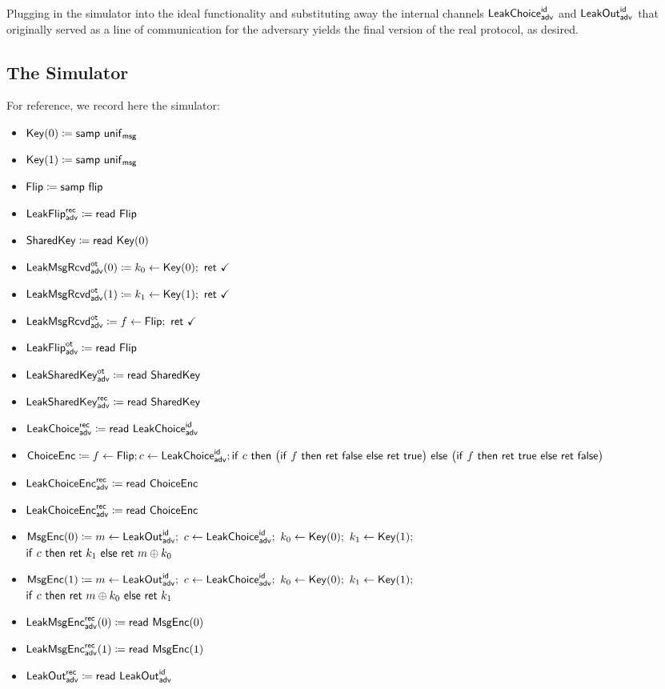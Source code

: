 Plugging in the simulator into the ideal functionality and substituting away the internal channels $\LeakChoice^\id_\adv$ and $\LeakOut^\id_\adv$ that originally served as a line of communication for the adversary yields the final version of the real protocol, as desired.

\subsection{The Simulator}
For reference, we record here the simulator:
\begin{itemize}
\item $\Key(0) \coloneqq \samp{\unif_\msg}$
\item $\Key(1) \coloneqq \samp{\unif_\msg}$
\item $\Flip \coloneqq \samp{\flip}$
\item {\color{blue} $\LeakFlip^\rec_\adv \coloneqq \read{\Flip}$}
\item $\SharedKey \coloneqq \read{\Key(0)}$
\item {\color{blue} $\LeakKeyRcvd^\ot_\adv(0) \coloneqq k_0 \leftarrow \Key(0); \ \ret{\checkmark}$}
\item {\color{blue} $\LeakKeyRcvd^\ot_\adv(1) \coloneqq k_1 \leftarrow \Key(1); \ \ret{\checkmark}$}
\item {\color{blue} $\LeakFlipRcvd^\ot_\adv \coloneqq f \leftarrow \Flip; \ \ret{\checkmark}$}
\item {\color{blue} $\LeakFlip^\ot_\adv \coloneqq \read{\Flip}$}
\item {\color{blue} $\LeakSharedKey^\ot_\adv \coloneqq \read{\SharedKey}$}
\item {\color{blue} $\LeakSharedKey^\rec_\adv \coloneqq \read{\SharedKey}$}
\item {\color{blue} $\LeakChoice^\rec_\adv \coloneqq \read{\LeakChoice^\id_\adv}$}
\item $\ChoiceEnc \coloneqq f \leftarrow \Flip; c \leftarrow \LeakChoice^\id_\adv; \\ \ifte{c}{\big(\ifte{f}{\ret{\false}}{\ret{\true}}\big)}{\big(\ifte{f}{\ret{\true}}{\ret{\false}}\big)}$
\item {\color{blue} $\LeakChoiceEnc^\rec_\adv \coloneqq \read{\ChoiceEnc}$}
\item {\color{blue} $\LeakChoiceEnc^\rec_\adv \coloneqq \read{\ChoiceEnc}$}
\item $\MsgEnc(0) \coloneqq m \leftarrow \LeakOut^\id_\adv; \ c \leftarrow \LeakChoice^\id_\adv; \ k_0 \leftarrow \Key(0); \ k_1 \leftarrow \Key(1);$ \\ $\ifte{c}{\ret{k_1}}{\ret{m \oplus k_0}}$
\item $\MsgEnc(1) \coloneqq m \leftarrow \LeakOut^\id_\adv; \ c \leftarrow \LeakChoice^\id_\adv; \ k_0 \leftarrow \Key(0); \ k_1 \leftarrow \Key(1);$ \\ $\ifte{c}{\ret{m \oplus k_0}}{\ret{k_1}}$
\item {\color{blue} $\LeakMsgEnc^\rec_\adv(0) \coloneqq \read{\MsgEnc(0)}$}
\item {\color{blue} $\LeakMsgEnc^\rec_\adv(1) \coloneqq \read{\MsgEnc(1)}$}
\item {\color{blue} $\LeakOut^\rec_\adv \coloneqq \read{\LeakOut^\id_\adv}$}
\end{itemize}